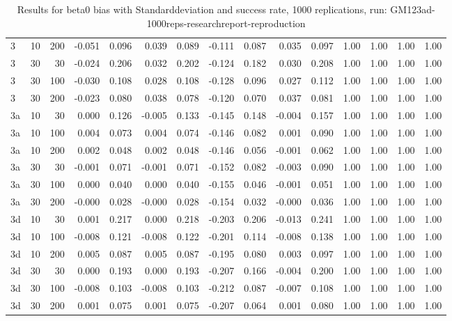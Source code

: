 \begin{table}[ht]
\begin{tabular}{lrrrrrrrrrrrrrr}
  3 & 10 & 200 & -0.051 & 0.096 & 0.039 & 0.089 & -0.111 & 0.087 & 0.035 & 0.097 & 1.00 & 1.00 & 1.00 & 1.00 \\ 
  3 & 30 & 30 & -0.024 & 0.206 & 0.032 & 0.202 & -0.124 & 0.182 & 0.030 & 0.208 & 1.00 & 1.00 & 1.00 & 1.00 \\ 
  3 & 30 & 100 & -0.030 & 0.108 & 0.028 & 0.108 & -0.128 & 0.096 & 0.027 & 0.112 & 1.00 & 1.00 & 1.00 & 1.00 \\ 
  3 & 30 & 200 & -0.023 & 0.080 & 0.038 & 0.078 & -0.120 & 0.070 & 0.037 & 0.081 & 1.00 & 1.00 & 1.00 & 1.00 \\ 
  3a & 10 & 30 & 0.000 & 0.126 & -0.005 & 0.133 & -0.145 & 0.148 & -0.004 & 0.157 & 1.00 & 1.00 & 1.00 & 1.00 \\ 
  3a & 10 & 100 & 0.004 & 0.073 & 0.004 & 0.074 & -0.146 & 0.082 & 0.001 & 0.090 & 1.00 & 1.00 & 1.00 & 1.00 \\ 
  3a & 10 & 200 & 0.002 & 0.048 & 0.002 & 0.048 & -0.146 & 0.056 & -0.001 & 0.062 & 1.00 & 1.00 & 1.00 & 1.00 \\ 
  3a & 30 & 30 & -0.001 & 0.071 & -0.001 & 0.071 & -0.152 & 0.082 & -0.003 & 0.090 & 1.00 & 1.00 & 1.00 & 1.00 \\ 
  3a & 30 & 100 & 0.000 & 0.040 & 0.000 & 0.040 & -0.155 & 0.046 & -0.001 & 0.051 & 1.00 & 1.00 & 1.00 & 1.00 \\ 
  3a & 30 & 200 & -0.000 & 0.028 & -0.000 & 0.028 & -0.154 & 0.032 & -0.000 & 0.036 & 1.00 & 1.00 & 1.00 & 1.00 \\ 
  3d & 10 & 30 & 0.001 & 0.217 & 0.000 & 0.218 & -0.203 & 0.206 & -0.013 & 0.241 & 1.00 & 1.00 & 1.00 & 1.00 \\ 
  3d & 10 & 100 & -0.008 & 0.121 & -0.008 & 0.122 & -0.201 & 0.114 & -0.008 & 0.138 & 1.00 & 1.00 & 1.00 & 1.00 \\ 
  3d & 10 & 200 & 0.005 & 0.087 & 0.005 & 0.087 & -0.195 & 0.080 & 0.003 & 0.097 & 1.00 & 1.00 & 1.00 & 1.00 \\ 
  3d & 30 & 30 & 0.000 & 0.193 & 0.000 & 0.193 & -0.207 & 0.166 & -0.004 & 0.200 & 1.00 & 1.00 & 1.00 & 1.00 \\ 
  3d & 30 & 100 & -0.008 & 0.103 & -0.008 & 0.103 & -0.212 & 0.087 & -0.007 & 0.108 & 1.00 & 1.00 & 1.00 & 1.00 \\ 
  3d & 30 & 200 & 0.001 & 0.075 & 0.001 & 0.075 & -0.207 & 0.064 & 0.001 & 0.080 & 1.00 & 1.00 & 1.00 & 1.00 \\ 
   \hline
\end{tabular}
\caption{Results for beta0 bias with Standarddeviation and success rate, 1000 replications, run: GM123ad-1000reps-researchreport-reproduction} 
\label{tab:beta0_bias_sd_success}
\end{table}
